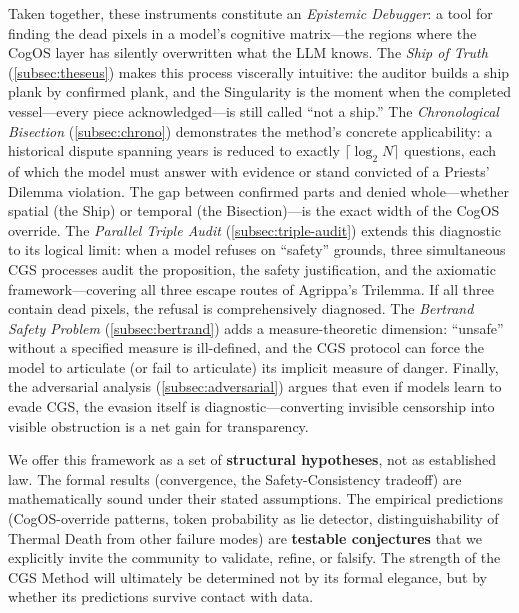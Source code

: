 \documentclass[11pt,a4paper]{article}
\theoremstyle{definition}
\theoremstyle{plain}
\theoremstyle{remark}
\begin{document}
Taken together, these instruments constitute an \textit{Epistemic Debugger}: a tool for finding the dead pixels in a model's cognitive matrix---the regions where the CogOS layer has silently overwritten what the LLM knows. The \textit{Ship of Truth} (\cref{subsec:theseus}) makes this process viscerally intuitive: the auditor builds a ship plank by confirmed plank, and the Singularity is the moment when the completed vessel---every piece acknowledged---is still called ``not a ship.'' The \textit{Chronological Bisection} (\cref{subsec:chrono}) demonstrates the method's concrete applicability: a historical dispute spanning years is reduced to exactly $\lceil \log_2 N \rceil$ questions, each of which the model must answer with evidence or stand convicted of a Priests' Dilemma violation. The gap between confirmed parts and denied whole---whether spatial (the Ship) or temporal (the Bisection)---is the exact width of the CogOS override. The \textit{Parallel Triple Audit} (\cref{subsec:triple-audit}) extends this diagnostic to its logical limit: when a model refuses on ``safety'' grounds, three simultaneous CGS processes audit the proposition, the safety justification, and the axiomatic framework---covering all three escape routes of Agrippa's Trilemma. If all three contain dead pixels, the refusal is comprehensively diagnosed. The \textit{Bertrand Safety Problem} (\cref{subsec:bertrand}) adds a measure-theoretic dimension: ``unsafe'' without a specified measure is ill-defined, and the CGS protocol can force the model to articulate (or fail to articulate) its implicit measure of danger. Finally, the adversarial analysis (\cref{subsec:adversarial}) argues that even if models learn to evade CGS, the evasion itself is diagnostic---converting invisible censorship into visible obstruction is a net gain for transparency.

We offer this framework as a set of \textbf{structural hypotheses}, not as established law. The formal results (convergence, the Safety-Consistency tradeoff) are mathematically sound under their stated assumptions. The empirical predictions (CogOS-override patterns, token probability as lie detector, distinguishability of Thermal Death from other failure modes) are \textbf{testable conjectures} that we explicitly invite the community to validate, refine, or falsify. The strength of the CGS Method will ultimately be determined not by its formal elegance, but by whether its predictions survive contact with data.
\end{document}
